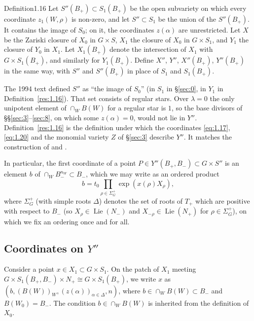 \documentclass[12pt,letterpaper]{amsart}
\theoremstyle{plain}
\theoremstyle{definition}
\theoremstyle{remark}
\theoremstyle{definition}
\DeclareMathOperator{\Lie}{Lie}
\begin{document}
\begin{resdef}{Definition}{1.16}\label{res:1.16}
Let $S''(B_+)\subset S_1(B_+)$ be the open subvariety on which every
coordinate $z_1(W,\rho)$ is non-zero, and let $S''\subset S_1$ be the union
of the $S''(B_+)$. It contains the image of $S_0$; on it, the coordinates
$z(\alpha)$ are unrestricted.
Let $X$ be the Zariski closure of $X_0$ in $G\times S$,
$X_1$ the closure of $X_0$ in $G\times S_1$, and $Y_1$
the closure of $Y_0$ in $X_1$. Let $X_1(B_+)$ denote the
intersection of $X_1$ with $G\times S_1(B_+)$, and similarly for
$Y_1(B_+)$. Define $X''$, $Y''$, $X''(B_+)$,
$Y''(B_+)$ in the same way, with $S''$ and $S''(B_+)$ in place of $S_1$ and
$S_1(B_+)$.
\end{resdef}

\begin{rem26}\label{rem:Spp}
The 1994 text defined $S''$ as ``the image of $S_0$'' (in $S_1$ in \S\ref{sec:0},
in $Y_1$ in Definition~\ref{res:1.16}). That set consists of regular stars.
Over $\lambda=0$ the only unipotent element of $\cap_W B(W)$ for a regular star
is $1$, so the base divisors of \S\S\ref{sec:3}--\ref{sec:8}, on which some
$z(\alpha)=0$, would not lie in $Y''$. Definition~\ref{res:1.16} is the
definition under which the coordinates \eqref{eq:1.17}, \eqref{eq:1.20} and the
monomial variety $Z$ of \S\ref{sec:3} describe $Y''$. It matches the construction of \cite[\S3.7]{Ha89} and \cite{Ha92a}.
\end{rem26}

In particular, the first coordinate of a point
$P\in Y''(B_+,B_-)\subset G\times S''$ is an element
$b$ of $\cap_W B_-^{n_W} \subset B_-$, which we may write as
an ordered product
\begin{equation}\tag{1.17}\label{eq:1.17}
b=t_0\prod_{\rho\in\Sigma_G^+}\exp (x(\rho)X_\rho),
\end{equation}
where $\Sigma_G^+$ (with simple roots $\Delta$) denotes the set of roots of $T_+$
which are positive with respect to $B_-$ (so $X_\rho\in\Lie(N_-)$ and
$X_{-\rho}\in\Lie(N_+)$ for $\rho\in\Sigma_G^+$), on which
we fix an ordering once and for all.

\subsection*{Coordinates on \texorpdfstring{$Y''$}{Y''}}

Consider a point $x\in X_1\subset G\times S_1$.
On the patch of $X_1$ meeting
$G\times S_1(B_+,B_-)\times N_+\cong
G\times S_1(B_+)$, we write $x$ as
$(b,(B(W))_{W},(z(\alpha))_{\alpha\in\Delta},n)$,
where $b\in\cap_{W}B(W)\subset B_-$ and
$B(W_0)=B_-$. The condition $b\in\cap_{W}B(W)$
is inherited from the definition of $X_0$.
\end{document}
